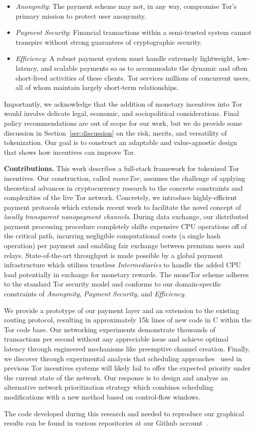 \begin{itemize}
\item \emph{Anonymity}: The payment scheme may not, in any way, compromise Tor's primary mission to protect user anonymity.
\item \emph{Payment Security}: Financial transactions within a semi-trusted system cannot transpire without strong guarantees of cryptographic security.
\item \emph{Efficiency}: A robust payment system must handle extremely lightweight, low-latency, and scalable payments so as to accommodate the dynamic and often short-lived activities of these clients.
Tor services millions of concurrent users, all of whom maintain largely short-term relationships.
\end{itemize}

Importantly, we acknowledge that the addition of monetary incentives into Tor would involve delicate legal, economic, and sociopolitical considerations.
Final policy recommendations are out of scope for our work, but we do provide some discussion in Section~\ref{sec:discussion} on the risk, merits, and versatility of tokenization.
Our goal is to construct an adaptable and value-agnostic design that shows how incentives can improve Tor.

\label{sec:Contributions} \medskip \noindent \textbf{Contributions.}
This work describes a full-stack framework for tokenized Tor incentives.
Our construction, called \emph{moneTor}, assumes the challenge of applying theoretical advances in cryptocurrency research to the concrete constraints and complexities of the live Tor network.
Concretely, we introduce highly-efficient payment protocols which extends recent work to facilitate the novel concept of \emph{locally transparent nanopayment channels}.
During data exchange, our distributed payment processing procedure completely shifts expensive CPU operations off of the critical path, incurring negligible computational costs (a single hash operation) per payment and enabling fair exchange between premium users and relays.
State-of-the-art throughput is made possible by a global payment infrastructure which utilizes trustless \emph{Intermediaries} to handle the added CPU load potentially in exchange for monetary rewards.
The moneTor scheme adheres to the standard Tor security model and conforms to our domain-specific constraints of \emph{Anonymity}, \emph{Payment Security}, and \emph{Efficiency}.

We provide a prototype of our payment layer and an extension to the existing routing protocol, resulting in approximately 15k lines of new code in C within the Tor code base.
Our networking experiments demonstrate thousands of transactions per second without any appreciable issue and achieve optimal latency through engineered mechanisms like preemptive channel creation.
Finally, we discover through experimental analysis that scheduling approaches~\cite{dovrolis1999case, tang2010improved} used in previous Tor incentives systems will likely fail to offer the expected priority under the current state of the network.
Our response is to design and analyze an alternative network prioritization strategy which combines scheduling modifications with a new method based on control-flow windows.

The code developed during this research and needed to reproduce our graphical results can be found in various repositories at our Github account~\cite{monetor-github}.

